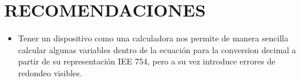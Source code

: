 \documentclass[12pt]{article}
\begin{document}
\section*{RECOMENDACIONES}
\begin{itemize}
    \item Tener un dispositivo como una calculadora nos permite de manera sencilla calcular  algunas variables dentro de la ecuación para la conversion decimal a partir de su representación IEE 754, pero a su vez introduce errores de redondeo visibles.
   
\end{itemize}

\vspace{0.5cm}


\renewcommand{\refname}{\MakeUppercase{REFERENCIAS}}


\end{document}

